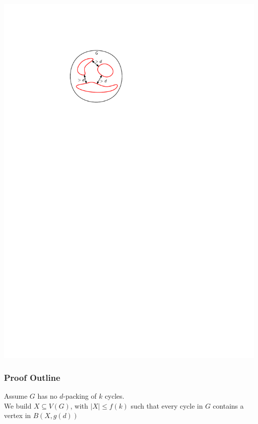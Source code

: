 \documentclass{beamer}
\begin{document}
\begin{frame}
\begin{center}
    \includegraphics[page=2]{figs/cep}
  \end{center}
\end{frame}

\begin{frame}
  \frametitle{Proof Outline}

  Assume $G$ has no $d$-packing of $k$ cycles.\\[3ex]
  We build $X\subseteq V(G)$, with $|X|\le f(k)$ such that every cycle in $G$ contains a vertex in $B(X,g(d))$
\end{frame}
\end{document}
